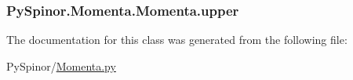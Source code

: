 \subsubsection[{upper}]{\setlength{\rightskip}{0pt plus 5cm}Py\+Spinor.\+Momenta.\+Momenta.\+upper}\label{class_py_spinor_1_1_momenta_1_1_momenta_aec5ba529ec5c2c293dd3629aca2555f7}


The documentation for this class was generated from the following file\+:\begin{DoxyCompactItemize}
\item 
Py\+Spinor/\hyperlink{_momenta_8py}{Momenta.\+py}\end{DoxyCompactItemize}
